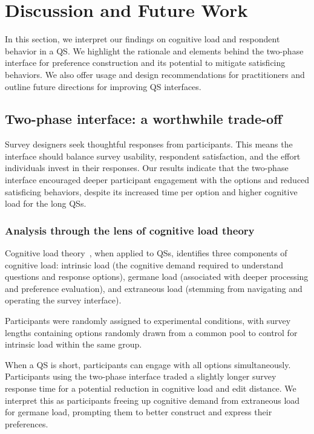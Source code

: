 \section{Discussion and Future Work}
\label{sec:discussion}

In this section, we interpret our findings on cognitive load and respondent behavior in a QS. We highlight the rationale and elements behind the two-phase interface for preference construction and its potential to mitigate satisficing behaviors. We also offer usage and design recommendations for practitioners and outline future directions for improving QS interfaces.

\subsection{Two-phase interface: a worthwhile trade-off}
Survey designers seek thoughtful responses from participants. This means the interface should balance survey usability, respondent satisfaction, and the effort individuals invest in their responses. Our results indicate that the two-phase interface encouraged deeper participant engagement with the options and reduced satisficing behaviors, despite its increased time per option and higher cognitive load for the long QSs.

\subsubsection{Analysis through the lens of cognitive load theory}
Cognitive load theory~\cite{swellerCognitiveLoadTheory2011}, when applied to QSs, identifies three components of cognitive load: intrinsic load (the cognitive demand required to understand questions and response options), germane load (associated with deeper processing and preference evaluation), and extraneous load (stemming from navigating and operating the survey interface).

Participants were randomly assigned to experimental conditions, with survey lengths containing options randomly drawn from a common pool to control for intrinsic load within the same group. 

When a QS is short, participants can engage with all options simultaneously. Participants using the two-phase interface traded a slightly longer survey response time for a potential reduction in cognitive load and edit distance. We interpret this as participants freeing up cognitive demand from extraneous load for germane load, prompting them to better construct and express their preferences.

